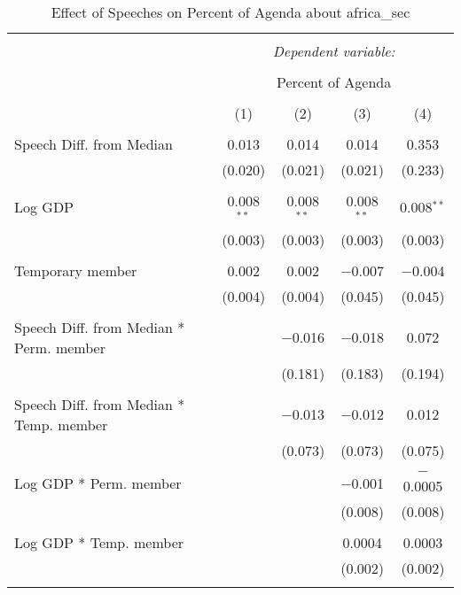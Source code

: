 
\begin{table}[!htbp] \centering 
  \caption{Effect of Speeches on Percent of Agenda about  africa_sec} 
  \label{} 
\begin{tabular}{@{\extracolsep{5pt}}lcccc} 
\\[-1.8ex]\hline 
\hline \\[-1.8ex] 
 & \multicolumn{4}{c}{\textit{Dependent variable:}} \\ 
\cline{2-5} 
\\[-1.8ex] & \multicolumn{4}{c}{Percent of Agenda} \\ 
\\[-1.8ex] & (1) & (2) & (3) & (4)\\ 
\hline \\[-1.8ex] 
 Speech Diff. from Median & 0.013 & 0.014 & 0.014 & 0.353 \\ 
  & (0.020) & (0.021) & (0.021) & (0.233) \\ 
  & & & & \\ 
 Log GDP & 0.008$^{**}$ & 0.008$^{**}$ & 0.008$^{**}$ & 0.008$^{**}$ \\ 
  & (0.003) & (0.003) & (0.003) & (0.003) \\ 
  & & & & \\ 
 Temporary member & 0.002 & 0.002 & $-$0.007 & $-$0.004 \\ 
  & (0.004) & (0.004) & (0.045) & (0.045) \\ 
  & & & & \\ 
 Speech Diff. from Median * Perm. member &  & $-$0.016 & $-$0.018 & 0.072 \\ 
  &  & (0.181) & (0.183) & (0.194) \\ 
  & & & & \\ 
 Speech Diff. from Median * Temp. member &  & $-$0.013 & $-$0.012 & 0.012 \\ 
  &  & (0.073) & (0.073) & (0.075) \\ 
  & & & & \\ 
 Log GDP * Perm. member &  &  & $-$0.001 & $-$0.0005 \\ 
  &  &  & (0.008) & (0.008) \\ 
  & & & & \\ 
 Log GDP * Temp. member &  &  & 0.0004 & 0.0003 \\ 
  &  &  & (0.002) & (0.002) \\ 
  & & & & \\ 

\end{tabular}
\end{table}
